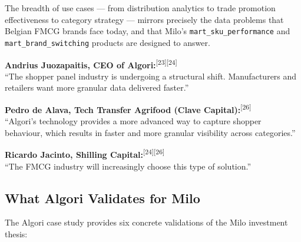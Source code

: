 \documentclass[11pt,a4paper]{article}
\begin{document}
\vspace{0.5em}

The breadth of use cases --- from distribution analytics to trade promotion effectiveness to category strategy --- mirrors precisely the data problems that Belgian FMCG brands face today, and that Milo's \texttt{mart\_sku\_performance} and \texttt{mart\_brand\_switching} products are designed to answer.

\vspace{0.5em}

\begin{milobox}[title=Investor \& Founder Quotes on Market Validation]
\vspace{0.3em}
\textbf{Andrius Juozapaitis, CEO of Algori:}\textsuperscript{[23][24]}\\
{\small\color{milogray}``The shopper panel industry is undergoing a structural shift. Manufacturers and retailers want more granular data delivered faster.''}

\vspace{0.5em}
\textbf{Pedro de Alava, Tech Transfer Agrifood (Clave Capital):}\textsuperscript{[26]}\\
{\small\color{milogray}``Algori's technology provides a more advanced way to capture shopper behaviour, which results in faster and more granular visibility across categories.''}

\vspace{0.5em}
\textbf{Ricardo Jacinto, Shilling Capital:}\textsuperscript{[24][26]}\\
{\small\color{milogray}``The FMCG industry will increasingly choose this type of solution.''}
\end{milobox}

\subsection{What Algori Validates for Milo}

The Algori case study provides six concrete validations of the Milo investment thesis:
\end{document}
